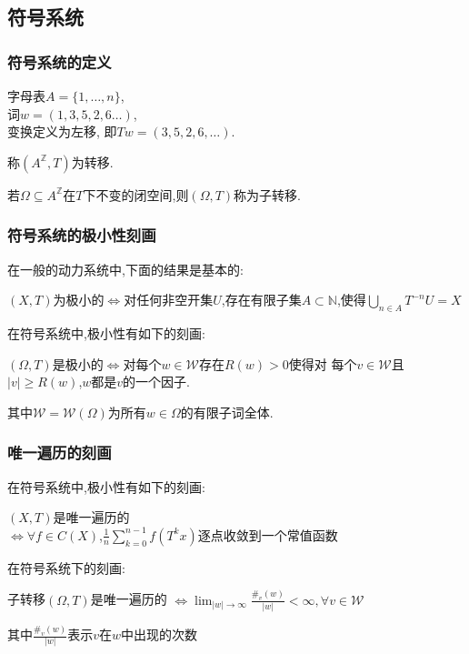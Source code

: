 \documentclass[compress,red]{beamer}
\begin{document}
\subsection{符号系统}
\begin{frame}
\frametitle{符号系统的定义}
\begin{example}
字母表$A=\{1,\ldots,n\}$,\\ \pause 
词$w=(1,3,5,2,6\ldots)$,\\ \pause
变换定义为左移, \pause 
即$Tw=(3,5,2,6,\ldots)$.
\end{example}
\pause
\begin{definition}
称$(A^{\mathbb{Z}},T)$为转移.\pause

\medskip 
若$\Omega\subseteq A^{\mathbb{Z}}$在$T$下不变的闭空间,则$(\Omega,T)$称为子转移.
\end{definition}
\end{frame}

\begin{frame}
\frametitle{符号系统的极小性刻画}
在一般的动力系统中,下面的结果是基本的:
\begin{theorem}
$(X,T)$为极小的$\Longleftrightarrow$对任何非空开集$U$,存在有限子集$A\subset \mathbb{N}$,使得$\bigcup_{n\in A}T^{-n}U=X$
\end{theorem}
\pause
在符号系统中,极小性有如下的刻画:
\begin{theorem}
$(\Omega,T)$是极小的$\Longleftrightarrow$对每个$w\in \mathcal{W}$存在$R(w)>0$使得对%
每个$v\in \mathcal{W}$且$|v|\geq R(w)$,$w$都是$v$的一个因子.
\end{theorem}
其中$\mathcal{W}=\mathcal{W}(\Omega)$为所有$w\in \Omega$的有限子词全体.
\end{frame}

\begin{frame}
\frametitle{唯一遍历的刻画}
在符号系统中,极小性有如下的刻画:
\begin{theorem}
$(X,T)$是唯一遍历的\\
$\Longleftrightarrow \forall f\in C(X)$,$\frac{1}{n}\sum_{k=0}^{n-1}f(T^kx)$逐点收敛到一个常值函数
\end{theorem}
\pause
在符号系统下的刻画:
\begin{theorem}
子转移$(\Omega,T)$是唯一遍历的
$\Longleftrightarrow \lim_{|w| \to \infty}\frac{\#_v(w)}{ |w |}<\infty, \forall v\in \mathcal{W}$
\end{theorem}
其中$\frac{\#_v(w)}{|w|}$表示$v\text{在}w\text{中出现的次数}$
\end{frame}
\end{document}
